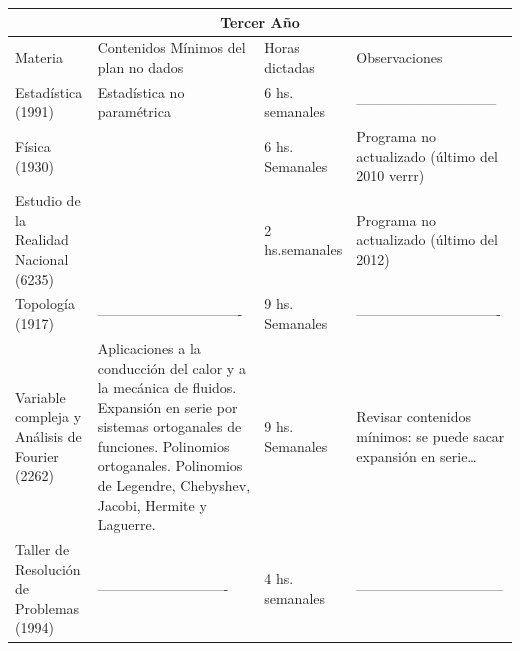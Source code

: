 \documentclass[a4paper,10pt,BCOR10mm,oneside,headsepline]{scrbook}
\begin{document}
\begin{subappendices}
\begin{tabular}{|p{3cm}|p{4cm}|p{2cm}|p{2cm}|}
\hline
\multicolumn{4}{|c|}{Tercer Año}\\ \hline
Materia                                          & Contenidos Mínimos del plan no dados                                                                                                                                                                                & Horas dictadas  & Observaciones                                                  \\ \hline
Estadística (1991)                               & Estadística no paramétrica                                                                                                                                                                                          & 6 hs. semanales & ------------------------------                                 \\ \hline
Física (1930)                                    &                                                                                                                                                                                                                     & 6 hs. Semanales & Programa no actualizado (último del 2010 verrr)                \\ \hline
Estudio de la Realidad Nacional (6235)           &                                                                                                                                                                                                                     & 2 hs.semanales  & Programa no actualizado (último del 2012)                      \\ \hline
Topología (1917)                                 & -------------------------------                                                                                                                                                                                     & 9 hs. Semanales & -------------------------------                                \\ \hline
Variable compleja y Análisis de Fourier (2262) & Aplicaciones a la conducción del calor y a la mecánica de fluidos. Expansión en serie por sistemas ortoganales de funciones. Polinomios ortoganales. Polinomios de Legendre, Chebyshev, Jacobi, Hermite y Laguerre. & 9 hs. Semanales & Revisar contenidos mínimos: se puede sacar expansión en serie… \\ \hline
Taller de Resolución de Problemas (1994)         & ----------------------------                                                                                                                                                                                        & 4 hs. semanales & --------------------------------                               \\ \hline

\end{tabular}
\end{subappendices}
\end{document}
